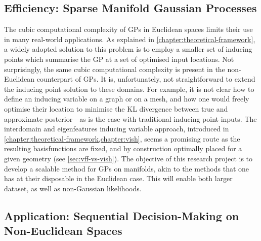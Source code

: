 \subsection{Efficiency: Sparse Manifold Gaussian Processes}

The cubic computational complexity of GPs in Euclidean spaces limits their use in many real-world applications. As explained in \cref{chapter:theoretical-framework}, a widely adopted solution to this problem is to employ a smaller set of inducing points which summarise the GP at a set of optimised input locations. Not surprisingly, the same cubic computational complexity is present in the non-Euclidean counterpart of GPs. It is, unfortunately, not straightforward to extend the inducing point solution to these domains. For example, it is not clear how to define an inducing variable on a graph or on a mesh, and how one would freely optimise their location to minimise the KL divergence between true and approximate posterior---as is the case with traditional inducing point inputs. The interdomain and eigenfeatures inducing variable approach, introduced in \cref{chapter:theoretical-framework,chapter:vish}, seems a promising route as the resulting basisfunctions are fixed, and by construction optimally placed for a given geometry (see \cref{sec:vff-vs-vish}). The objective of this research project is to develop a scalable method for GPs on manifolds, akin to the methods that one has at their disposable in the Euclidean case. This will enable both larger dataset, as well as non-Gaussian likelihoods.

\subsection{Application: Sequential Decision-Making on Non-Euclidean Spaces}

